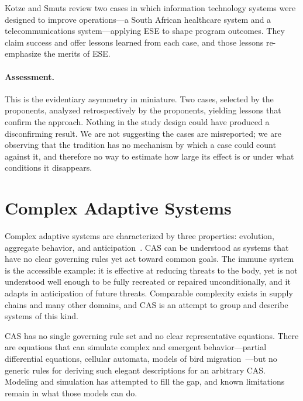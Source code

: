 \documentclass[11pt,a4paper]{article}
\begin{document}
Kotze and Smuts review two cases in which information technology systems were
designed to improve operations---a South African healthcare system and a
telecommunications system---applying ESE to shape program outcomes. They claim
success and offer lessons learned from each case, and those lessons re-emphasize
the merits of ESE.

\paragraph{Assessment.} This is the evidentiary asymmetry in miniature. Two
cases, selected by the proponents, analyzed retrospectively by the proponents,
yielding lessons that confirm the approach. Nothing in the study design could
have produced a disconfirming result. We are not suggesting the cases are
misreported; we are observing that the tradition has no mechanism by which a
case could count against it, and therefore no way to estimate how large its
effect is or under what conditions it disappears.

\section{Complex Adaptive Systems}
\label{sec:cas}

Complex adaptive systems are characterized by three properties: evolution,
aggregate behavior, and anticipation~\citep{holland1992}. CAS can be understood
as systems that have no clear governing rules yet act toward common goals. The
immune system is the accessible example: it is effective at reducing threats to
the body, yet is not understood well enough to be fully recreated or repaired
unconditionally, and it adapts in anticipation of future threats. Comparable
complexity exists in supply chains and many other domains, and CAS is an attempt
to group and describe systems of this kind.

CAS has no single governing rule set and no clear representative equations.
There are equations that can simulate complex and emergent behavior---partial
differential equations, cellular automata, models of bird
migration~\citep{stevens2021}---but no generic rules for deriving such elegant
descriptions for an arbitrary CAS. Modeling and simulation has attempted to fill
the gap, and known limitations remain in what those models can do.
\end{document}
